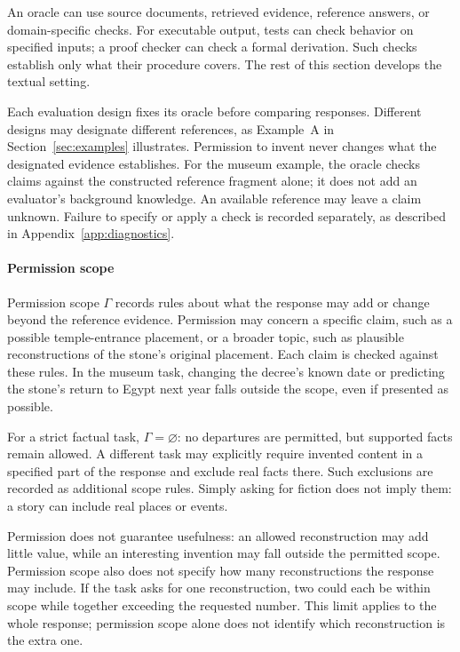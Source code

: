\documentclass{clv2025}
\begin{document}
An oracle can use source documents, retrieved evidence, reference answers,
or domain-specific checks. For executable output, tests can check behavior
on specified inputs; a proof checker can check a formal derivation. Such
checks establish only what their procedure covers. The rest of this section
develops the textual setting.

Each evaluation design fixes its oracle before comparing responses. Different
designs may designate different references, as Example~A in
Section~\ref{sec:examples} illustrates. Permission to invent never changes what
the designated evidence establishes. For the museum example, the oracle
checks claims against the constructed reference fragment alone; it does
not add an evaluator's background knowledge. An available reference may
leave a claim unknown. Failure to specify or apply a check is recorded
separately, as described in Appendix~\ref{app:diagnostics}.

\paragraph{Permission scope}
Permission scope $\Gamma$ records rules about what the response may add or
change beyond the reference evidence. Permission may concern a specific
claim, such as a possible temple-entrance placement, or a broader topic, such
as plausible reconstructions of the stone's original placement. Each claim
is checked against these rules. In the museum task, changing the decree's
known date or predicting the stone's return to Egypt next year falls outside
the scope, even if presented as possible.

For a strict factual task, $\Gamma=\varnothing$: no departures are permitted,
but supported facts remain allowed. A different task may explicitly require
invented content in a specified part of the response and exclude real facts
there. Such exclusions are recorded as additional scope rules. Simply asking
for fiction does not imply them: a story can include real places or events.

Permission does not guarantee usefulness: an allowed reconstruction may add
little value, while an interesting invention may fall outside the permitted
scope. Permission scope also does not specify how many reconstructions the
response may include. If the task asks for one reconstruction, two could each
be within scope while together exceeding the requested number. This limit
applies to the whole response; permission scope alone does not identify which
reconstruction is the extra one.
\end{document}
